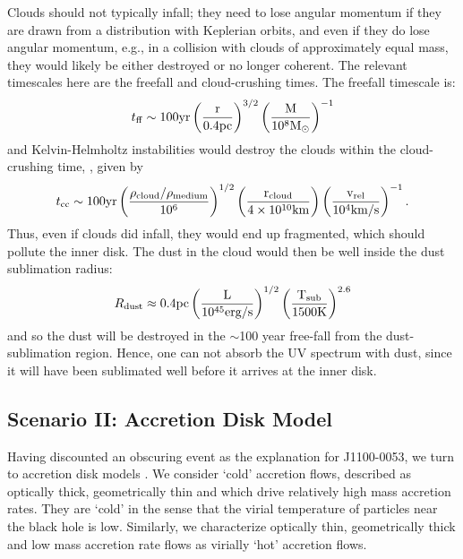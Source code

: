\documentclass[a4paper,fleqn,usenatbib]{mnras}
\begin{document}
Clouds should not typically infall; they need to lose angular momentum
if they are drawn from a distribution with Keplerian orbits, and even
if they do lose angular momentum, e.g., in a collision with clouds of 
approximately equal mass, they would likely be either destroyed or no
longer coherent. The relevant timescales here are the freefall and
cloud-crushing times. The freefall timescale is:
\begin{equation}
    t_{{\rm ff}}   \sim 100   \rm{yr}  \left(\frac{r}{0.4\rm{pc}}\right)^{3/2} 
                                            \left(\frac{M}{10^{8}M_{\odot}}\right)^{-1}
\end{equation}
and Kelvin-Helmholtz instabilities would destroy the clouds within the
cloud-crushing time, \citep[e.g., ][]{Nagakura2008, Hopkins2013,
Shiokawa2015, Bae2016}, given by
\begin{equation}
    t_{\rm cc} \sim 100\rm{yr} \left(\frac{\rho_{cloud}/\rho_{medium}}{10^{6}}\right)^{1/2} 
                                            \left(\frac{r_{\rm cloud}}{4 \times 10^{10}\rm{km}}\right) 
                                            \left(\frac{v_{\rm rel}}{10^{4}\rm{km/s}}\right)^{-1}.
\label{eqn:T_cloudcrushing}
\end{equation}
Thus, even if clouds did infall, they would end up fragmented, which
should pollute the inner disk.  The dust in the cloud would then be
well inside the dust sublimation radius:
\begin{equation}
    R_{\rm dust} \approx 0.4\rm{pc}\left(\frac{L}{10^{45}\rm{erg/s}}\right)^{1/2}
                                                   \left(\frac{T_{\rm sub}}{1500\rm{K}}\right)^{2.6}
\end{equation}
and so the dust will be destroyed in the $\sim$100 year free-fall from
the dust-sublimation region. Hence, one can not absorb the UV spectrum
with dust, since it will have been sublimated well before it arrives
at the inner disk.


\subsection{Scenario II: Accretion Disk Model}
Having discounted an obscuring event as the explanation for
J1100-0053, we turn to accretion disk models \citep[see also the
recent review by ][]{YuanNarayan2014}. We consider `cold' accretion
flows, described as optically thick, geometrically thin and which drive
relatively high mass accretion rates. They are `cold' in the sense
that the virial temperature of particles near the black hole is
low. Similarly, we characterize optically thin, geometrically thick
and low mass accretion rate flows as virially `hot' accretion flows.
\end{document}
